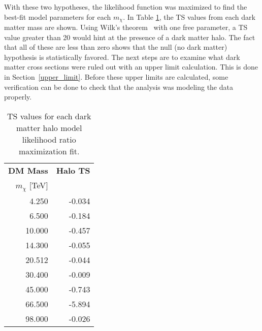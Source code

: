 With these two hypotheses, the likelihood function was maximized to find the best-fit model parameters for each $m_{\chi}$.
In Table \ref{tab:tsvals}, the TS values from each dark matter mass are shown.
Using Wilk's theorem~\cite{wilks1938} with one free parameter, a TS value greater than 20 would hint at the presence of a dark matter halo.
The fact that all of these are less than zero shows that the null (no dark matter) hypothesis is statistically favored.
The next steps are to examine what dark matter cross sections were ruled out with an upper limit calculation.
This is done in Section~\ref{upper_limit}.
Before these upper limits are calculated, some verification can be done to check that the analysis was modeling the data properly.

\begin{table}[!t]
  \centering
  \begin{tabular}{|r|r|}
    \hline
    \textbf{DM Mass}        & \textbf{Halo TS} \\
    \textbf{$m_\chi$} [TeV] &                  \\
    \hline 
     4.250 & -0.034 \\
     6.500 & -0.184 \\
    10.000 & -0.457 \\
    14.300 & -0.055 \\
    20.512 & -0.044 \\
    30.400 & -0.009 \\
    45.000 & -0.743 \\
    66.500 & -5.894 \\
    98.000 & -0.026 \\

    \hline 
  \end{tabular}
  \caption[Dark Matter Halo Test Statistic Values]{
    TS values for each dark matter halo model likelihood ratio maximization fit.
  }
  \label{tab:tsvals}
\end{table}

